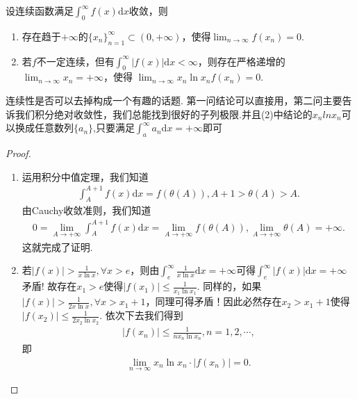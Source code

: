 \documentclass[../../main.tex]{subfiles}
\begin{document}
\begin{proposition}[积分收敛必有子列趋于0]\label{proposition:积分收敛必有子列趋于0}
设连续函数满足$\int_{0}^{\infty}f(x)\mathrm{d}x$收敛，则
\begin{enumerate}[(1)]
\item 存在趋于$+\infty$的$\{x_n\}_{n = 1}^{\infty}\subset(0,+\infty)$，使得$\lim_{n\to\infty}f(x_n)=0$.

\item 若$f$不一定连续，但有$\int_{0}^{\infty}|f(x)|\mathrm{d}x < \infty$，则存在严格递增的$\lim_{n\to\infty}x_n = +\infty$，使得
$\lim_{n\to\infty}x_n\ln x_nf(x_n)=0$.
\end{enumerate}
\end{proposition}
\begin{note}
连续性是否可以去掉构成一个有趣的话题. 第一问结论可以直接用，第二问主要告诉我们积分绝对收敛性，我们总能找到很好的子列极限.并且(2)中结论的$x_nlnx_n$可以换成任意数列$\{a_n\}$,只要满足$\int_{a}^{\infty}a_n\mathrm{d}x=+\infty$即可
\end{note}
\begin{proof}
\begin{enumerate}[(1)]
\item 运用积分中值定理，我们知道
\begin{align*}
\int_{A}^{A + 1}f(x)\mathrm{d}x = f(\theta(A)), A + 1 > \theta(A) > A.
\end{align*}
由Cauchy收敛准则，我们知道
\begin{align*}
0 = \lim_{A\to +\infty}\int_{A}^{A + 1}f(x)\mathrm{d}x = \lim_{A\to +\infty}f(\theta(A)), \lim_{A\to +\infty}\theta(A) = +\infty.
\end{align*}
这就完成了证明.

\item 若$|f(x)| > \frac{1}{x\ln x}, \forall x > e$，则由$\int_{e}^{\infty}\frac{1}{x\ln x}\mathrm{d}x = +\infty$可得$\int_e^{\infty}{\left| f\left( x \right) \right|\mathrm{d}x}=+\infty $矛盾! 故存在$x_1 > e$使得$|f(x_1)| \leqslant \frac{1}{x_1\ln x_1}$.
同样的，如果$|f(x)| > \frac{1}{2x\ln x}, \forall x > x_1 + 1$，同理可得矛盾！因此必然存在$x_2 > x_1 + 1$使得$|f(x_2)| \leqslant \frac{1}{2x_2\ln x_2}$. 依次下去我们得到
\begin{align*}
|f(x_n)| \leqslant \frac{1}{nx_n\ln x_n}, n = 1,2,\cdots,
\end{align*}
即
\begin{align*}
\lim_{n\to\infty}x_n\ln x_n\cdot|f(x_n)| = 0.
\end{align*} 
\end{enumerate}
\end{proof}
\end{document}

